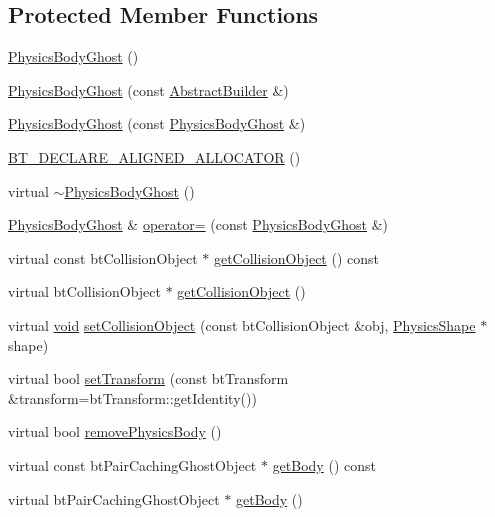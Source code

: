 \subsection*{Protected Member Functions}
\begin{DoxyCompactItemize}
\item 
\mbox{\hyperlink{classnjli_1_1_physics_body_ghost_a657ece9b7062ed0d514b9d62cf88c110}{Physics\+Body\+Ghost}} ()
\item 
\mbox{\hyperlink{classnjli_1_1_physics_body_ghost_acac7f2029377a783c65257451331b472}{Physics\+Body\+Ghost}} (const \mbox{\hyperlink{classnjli_1_1_abstract_builder}{Abstract\+Builder}} \&)
\item 
\mbox{\hyperlink{classnjli_1_1_physics_body_ghost_a41018c93aba8e1698a65da7813419d4c}{Physics\+Body\+Ghost}} (const \mbox{\hyperlink{classnjli_1_1_physics_body_ghost}{Physics\+Body\+Ghost}} \&)
\item 
\mbox{\hyperlink{classnjli_1_1_physics_body_ghost_a039b603e81b9f24508901ff3da80cc25}{B\+T\+\_\+\+D\+E\+C\+L\+A\+R\+E\+\_\+\+A\+L\+I\+G\+N\+E\+D\+\_\+\+A\+L\+L\+O\+C\+A\+T\+OR}} ()
\item 
virtual \mbox{\hyperlink{classnjli_1_1_physics_body_ghost_ab719eb5810bf02cc2a238b663ef08f34}{$\sim$\+Physics\+Body\+Ghost}} ()
\item 
\mbox{\hyperlink{classnjli_1_1_physics_body_ghost}{Physics\+Body\+Ghost}} \& \mbox{\hyperlink{classnjli_1_1_physics_body_ghost_a40aa22c5e94ed4d58315d538bad51732}{operator=}} (const \mbox{\hyperlink{classnjli_1_1_physics_body_ghost}{Physics\+Body\+Ghost}} \&)
\item 
virtual const bt\+Collision\+Object $\ast$ \mbox{\hyperlink{classnjli_1_1_physics_body_ghost_a79b35eaf9c790ef43ad3e0f4a8a4c518}{get\+Collision\+Object}} () const
\item 
virtual bt\+Collision\+Object $\ast$ \mbox{\hyperlink{classnjli_1_1_physics_body_ghost_a6e5a9ffb4448b4a73bac8e3e44421698}{get\+Collision\+Object}} ()
\item 
virtual \mbox{\hyperlink{_thread_8h_af1e856da2e658414cb2456cb6f7ebc66}{void}} \mbox{\hyperlink{classnjli_1_1_physics_body_ghost_a87c4ba0c2317a6e6e40231f58a1c9ed5}{set\+Collision\+Object}} (const bt\+Collision\+Object \&obj, \mbox{\hyperlink{classnjli_1_1_physics_shape}{Physics\+Shape}} $\ast$shape)
\item 
virtual bool \mbox{\hyperlink{classnjli_1_1_physics_body_ghost_aa6f6ca168453f49b48d295a1bb8d7228}{set\+Transform}} (const bt\+Transform \&transform=bt\+Transform\+::get\+Identity())
\item 
virtual bool \mbox{\hyperlink{classnjli_1_1_physics_body_ghost_a854f866870a887026cfb87d441008595}{remove\+Physics\+Body}} ()
\item 
virtual const bt\+Pair\+Caching\+Ghost\+Object $\ast$ \mbox{\hyperlink{classnjli_1_1_physics_body_ghost_ab25cf5362db7227eafe8db536905d078}{get\+Body}} () const
\item 
virtual bt\+Pair\+Caching\+Ghost\+Object $\ast$ \mbox{\hyperlink{classnjli_1_1_physics_body_ghost_a2d883e17713153e92b13c0a7ad324c25}{get\+Body}} ()
\end{DoxyCompactItemize}
